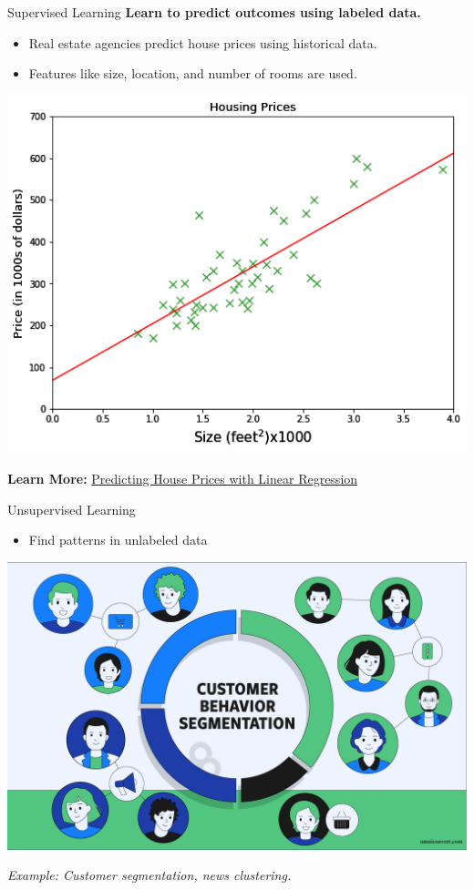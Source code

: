 \documentclass[serif, aspectratio=169]{beamer}
\begin{document}
\begin{frame}{Supervised Learning}
\textbf{Learn to predict outcomes using labeled data.}

\begin{itemize}
    \item Real estate agencies predict house prices using historical data.
    \item Features like size, location, and number of rooms are used.
\end{itemize}

\begin{center}
    \centering
    \includegraphics[width=0.4\linewidth]{pic/be1.jpg}
\end{center}

\textbf{Learn More:}
\href{https://towardsdatascience.com/predicting-house-prices-with-linear-regression-machine-learning-from-scratch-part-ii-47a0238aeac1}{Predicting House Prices with Linear Regression}
\end{frame}

\begin{frame}{Unsupervised Learning}
    \begin{itemize}
        \item Find patterns in unlabeled data
    \end{itemize}
    \vspace{0.5cm}
    \begin{center}
    \includegraphics[width=0.6\linewidth]{pic/be2.jpg} 
    \end{center}
    \begin{center}
        \textit{Example: Customer segmentation, news clustering.}
    \end{center}
\end{frame}
\end{document}
